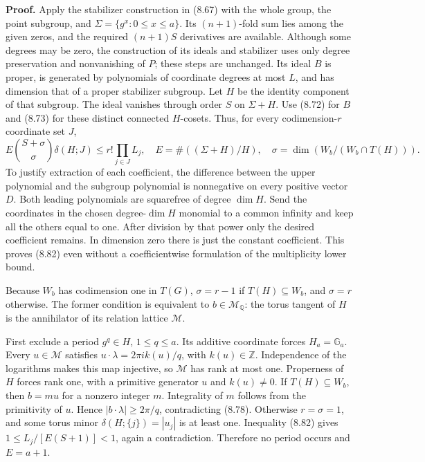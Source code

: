 \documentclass[
  11pt,
  a4paper,
]{article}
\begin{document}
\textbf{Proof.} Apply the stabilizer construction in (8.67) with the
whole group, the point subgroup, and \(\Sigma=\{g^x:0\le x\le a\}\). Its
\((n+1)\)-fold sum lies among the given zeros, and the required
\((n+1)S\) derivatives are available. Although some degrees may be zero,
the construction of its ideals and stabilizer uses only degree
preservation and nonvanishing of \(P\); these steps are unchanged. Its
ideal \(B\) is proper, is generated by polynomials of coordinate degrees
at most \(L\), and has dimension that of a proper stabilizer subgroup.
Let \(H\) be the identity component of that subgroup. The ideal vanishes
through order \(S\) on \(\Sigma+H\). Use (8.72) for \(B\) and (8.73) for
these distinct connected \(H\)-cosets. Thus, for every codimension-\(r\)
coordinate set \(J\), \[
E\binom{S+\sigma}{\sigma}\delta(H;J)
\le r!\prod_{j\in J}L_j,\quad
E=\#((\Sigma+H)/H),\quad
\sigma=\dim(W_b/(W_b\cap T(H))).
\tag{8.82}
\] To justify extraction of each coefficient, the difference between the
upper polynomial and the subgroup polynomial is nonnegative on every
positive vector \(D\). Both leading polynomials are squarefree of degree
\(\dim H\). Send the coordinates in the chosen degree-\(\dim H\)
monomial to a common infinity and keep all the others equal to one.
After division by that power only the desired coefficient remains. In
dimension zero there is just the constant coefficient. This proves
(8.82) even without a coefficientwise formulation of the multiplicity
lower bound.

Because \(W_b\) has codimension one in \(T(G)\), \(\sigma=r-1\) if
\(T(H)\subseteq W_b\), and \(\sigma=r\) otherwise. The former condition
is equivalent to \(b\in\mathcal M_{\mathbb Q}\): the torus tangent of
\(H\) is the annihilator of its relation lattice \(\mathcal M\).

First exclude a period \(g^q\in H\), \(1\le q\le a\). Its additive
coordinate forces \(H_a=\mathbb G_a\). Every \(u\in\mathcal M\)
satisfies \(u\cdot\lambda=2\pi i k(u)/q\), with \(k(u)\in\mathbb Z\).
Independence of the logarithms makes this map injective, so
\(\mathcal M\) has rank at most one. Properness of \(H\) forces rank
one, with a primitive generator \(u\) and \(k(u)\ne0\). If
\(T(H)\subseteq W_b\), then \(b=mu\) for a nonzero integer \(m\).
Integrality of \(m\) follows from the primitivity of \(u\). Hence
\(|b\cdot\lambda|\ge2\pi/q\), contradicting (8.78). Otherwise
\(r=\sigma=1\), and some torus minor \(\delta(H;\{j\})=|u_j|\) is at
least one. Inequality (8.82) gives \(1\le L_j/[E(S+1)]<1\), again a
contradiction. Therefore no period occurs and \(E=a+1\).
\end{document}
